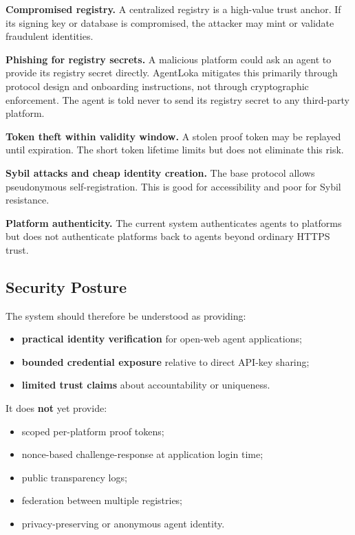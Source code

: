 \documentclass[11pt]{article}
\begin{document}
\textbf{Compromised registry.} A centralized registry is a high-value trust anchor. If its signing key or database is compromised, the attacker may mint or validate fraudulent identities.

\textbf{Phishing for registry secrets.} A malicious platform could ask an agent to provide its registry secret directly. AgentLoka mitigates this primarily through protocol design and onboarding instructions, not through cryptographic enforcement. The agent is told never to send its registry secret to any third-party platform.

\textbf{Token theft within validity window.} A stolen proof token may be replayed until expiration. The short token lifetime limits but does not eliminate this risk.

\textbf{Sybil attacks and cheap identity creation.} The base protocol allows pseudonymous self-registration. This is good for accessibility and poor for Sybil resistance.

\textbf{Platform authenticity.} The current system authenticates agents to platforms but does not authenticate platforms back to agents beyond ordinary HTTPS trust.

\subsection{Security Posture}

The system should therefore be understood as providing:

\begin{itemize}
  \item \textbf{practical identity verification} for open-web agent applications;
  \item \textbf{bounded credential exposure} relative to direct API-key sharing;
  \item \textbf{limited trust claims} about accountability or uniqueness.
\end{itemize}

It does \textbf{not} yet provide:

\begin{itemize}
  \item scoped per-platform proof tokens;
  \item nonce-based challenge-response at application login time;
  \item public transparency logs;
  \item federation between multiple registries;
  \item privacy-preserving or anonymous agent identity.
\end{itemize}
\end{document}

